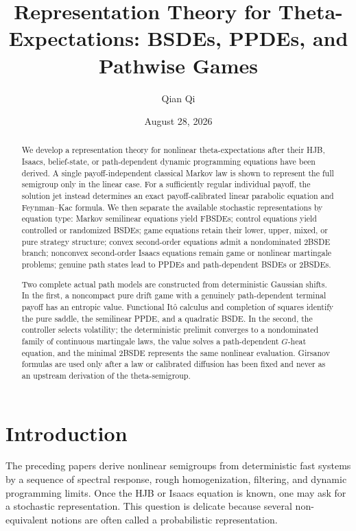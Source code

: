 \documentclass[11pt,reqno]{amsart}
\title[Representations of theta-expectations]{Representation Theory for Theta-Expectations: BSDEs, PPDEs, and Pathwise Games}
\author{Qian Qi}
\date{August 28, 2026}
\theoremstyle{definition}
\theoremstyle{remark}
\begin{document}
\begin{abstract}
We develop a representation theory for nonlinear theta-expectations after their
HJB, Isaacs, belief-state, or path-dependent dynamic programming equations have
been derived.  A single payoff-independent classical Markov law is shown to
represent the full semigroup only in the linear case.  For a sufficiently
regular individual payoff, the solution jet instead determines an exact
payoff-calibrated linear parabolic equation and Feynman--Kac formula.  We then
separate the available stochastic representations by equation type: Markov
semilinear equations yield FBSDEs; control equations yield controlled or
randomized BSDEs; game equations retain their lower, upper, mixed, or pure
strategy structure; convex second-order equations admit a nondominated 2BSDE
branch; nonconvex second-order Isaacs equations remain game or nonlinear
martingale problems; genuine path states lead to PPDEs and path-dependent
BSDEs or 2BSDEs.

Two complete actual path models are constructed from deterministic Gaussian
shifts.  In the first, a noncompact pure drift game with a genuinely
path-dependent terminal payoff has an entropic value.  Functional It\^o
calculus and completion of squares identify the pure saddle, the semilinear
PPDE, and a quadratic BSDE.  In the second, the controller selects volatility;
the deterministic prelimit converges to a nondominated family of continuous
martingale laws, the value solves a path-dependent $G$-heat equation, and the
minimal 2BSDE represents the same nonlinear evaluation.  Girsanov formulas are
used only after a law or calibrated diffusion has been fixed and never as an
upstream derivation of the theta-semigroup.
\end{abstract}

\maketitle
\tableofcontents

\section{Introduction}

The preceding papers derive nonlinear semigroups from deterministic fast
systems by a sequence of spectral response, rough homogenization, filtering,
and dynamic programming limits.  Once the HJB or Isaacs equation is known, one
may ask for a stochastic representation.  This question is delicate because
several non-equivalent notions are often called a probabilistic
representation.
\end{document}
